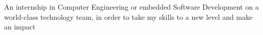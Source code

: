 

\begin{cvskills}

  \cvskill
    {}
    {An internship in Computer Engineering or embedded Software Development on a world-class technology team, in order to take my skills to a new level and make an impact    
    }

\end{cvskills}